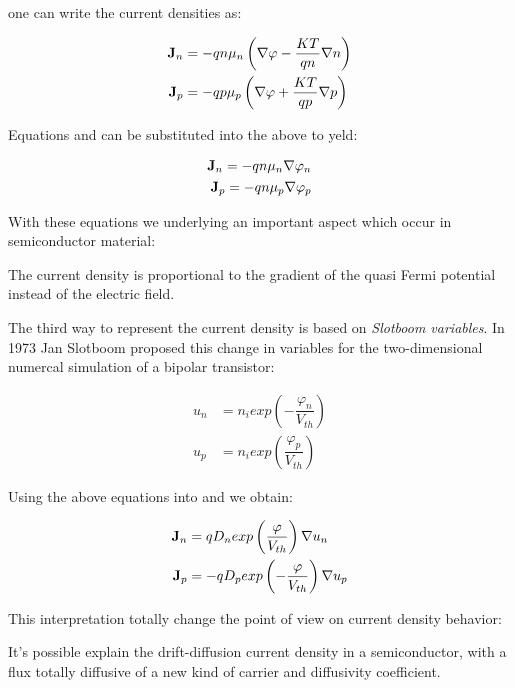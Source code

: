 one can write the current densities as:

\begin{align*}
\mathbf{J}_n &= -qn\mu_n\left(\nabla \varphi - \dfrac{KT}{qn}\nabla n \right)\\ 
\mathbf{J}_p &= -qp\mu_p\left(\nabla \varphi+ \dfrac{KT}{qp} \nabla p \right)
\end{align*}

Equations  and  can be substituted into the above to yeld:

\begin{align}
\mathbf{J}_n = -qn\mu_n\nabla \varphi_n \\
\mathbf{J}_p = -qn\mu_p\nabla \varphi_p 
\end{align}

With these equations we underlying an important aspect which occur in semiconductor material:
\begin{Osservazione}
The current density is proportional to the gradient of the quasi Fermi potential instead of the electric field.
\end{Osservazione}

The third way to represent the current density is based on \textit{Slotboom variables}. In 1973 Jan Slotboom proposed this change in variables for the two-dimensional numercal simulation of a bipolar transistor:

\begin{align}
u_n &= n_iexp\left(-\dfrac{\varphi_n}{V_{th}} \right) \label{eq: un slotboom} \\
u_p &= n_iexp\left(\dfrac{\varphi_p}{V_{th}} \right) \label{eq: up slotboom} 
\end{align}

Using the above equations into  and  we obtain:

\begin{align}
\mathbf{J}_n &= qD_n exp\left(\dfrac{\varphi}{V_{th}}\right) \nabla u_n \\
\mathbf{J}_p &= -qD_p exp\left(-\dfrac{\varphi}{V_{th}}\right)  \nabla u_p 
\end{align}

This interpretation totally change the point of view on current density behavior:

\begin{Osservazione}
It's possible explain the drift-diffusion current density in a semiconductor, with a flux totally diffusive of a new kind of carrier and diffusivity coefficient. 
\end{Osservazione}

